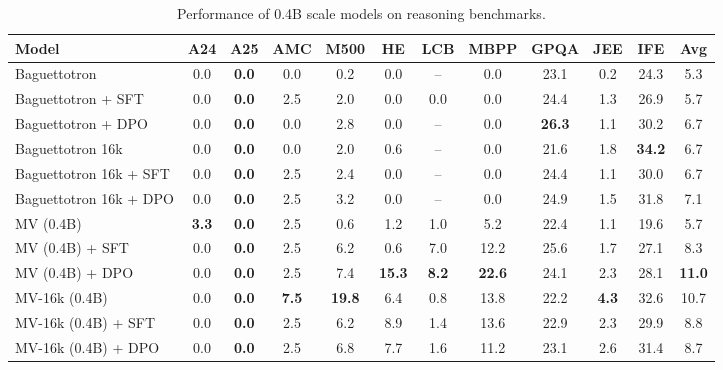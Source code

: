 \begin{table}[ht]
\centering
\caption{Performance of 0.4B scale models on reasoning benchmarks.}
\label{tab:evalchemy_table4}
\scriptsize
\begin{tabular}{lccccccccccc}
\toprule
\textbf{Model} & \textbf{A24} & \textbf{A25} & \textbf{AMC} & \textbf{M500} & \textbf{HE} & \textbf{LCB} & \textbf{MBPP} & \textbf{GPQA} & \textbf{JEE} & \textbf{IFE} & \textbf{Avg} \\
\midrule
Baguettotron & 0.0 & \textbf{0.0} & 0.0 & 0.2 & 0.0 & -- & 0.0 & 23.1 & 0.2 & 24.3 & 5.3 \\
Baguettotron + SFT & 0.0 & \textbf{0.0} & 2.5 & 2.0 & 0.0 & 0.0 & 0.0 & 24.4 & 1.3 & 26.9 & 5.7 \\
Baguettotron + DPO & 0.0 & \textbf{0.0} & 0.0 & 2.8 & 0.0 & -- & 0.0 & \textbf{26.3} & 1.1 & 30.2 & 6.7 \\
\midrule
\addlinespace[0.3em]
Baguettotron 16k & 0.0 & \textbf{0.0} & 0.0 & 2.0 & 0.6 & -- & 0.0 & 21.6 & 1.8 & \textbf{34.2} & 6.7 \\
Baguettotron 16k + SFT & 0.0 & \textbf{0.0} & 2.5 & 2.4 & 0.0 & -- & 0.0 & 24.4 & 1.1 & 30.0 & 6.7 \\
Baguettotron 16k + DPO & 0.0 & \textbf{0.0} & 2.5 & 3.2 & 0.0 & -- & 0.0 & 24.9 & 1.5 & 31.8 & 7.1 \\
\midrule
\addlinespace[0.3em]
MV (0.4B) & \textbf{3.3} & \textbf{0.0} & 2.5 & 0.6 & 1.2 & 1.0 & 5.2 & 22.4 & 1.1 & 19.6 & 5.7 \\
MV (0.4B) + SFT & 0.0 & \textbf{0.0} & 2.5 & 6.2 & 0.6 & 7.0 & 12.2 & 25.6 & 1.7 & 27.1 & 8.3 \\
MV (0.4B) + DPO & 0.0 & \textbf{0.0} & 2.5 & 7.4 & \textbf{15.3} & \textbf{8.2} & \textbf{22.6} & 24.1 & 2.3 & 28.1 & \textbf{11.0} \\
\midrule
\addlinespace[0.3em]
MV-16k (0.4B) & 0.0 & \textbf{0.0} & \textbf{7.5} & \textbf{19.8} & 6.4 & 0.8 & 13.8 & 22.2 & \textbf{4.3} & 32.6 & 10.7 \\
MV-16k (0.4B) + SFT & 0.0 & \textbf{0.0} & 2.5 & 6.2 & 8.9 & 1.4 & 13.6 & 22.9 & 2.3 & 29.9 & 8.8 \\
MV-16k (0.4B) + DPO & 0.0 & \textbf{0.0} & 2.5 & 6.8 & 7.7 & 1.6 & 11.2 & 23.1 & 2.6 & 31.4 & 8.7 \\
\bottomrule
\end{tabular}
\end{table}
